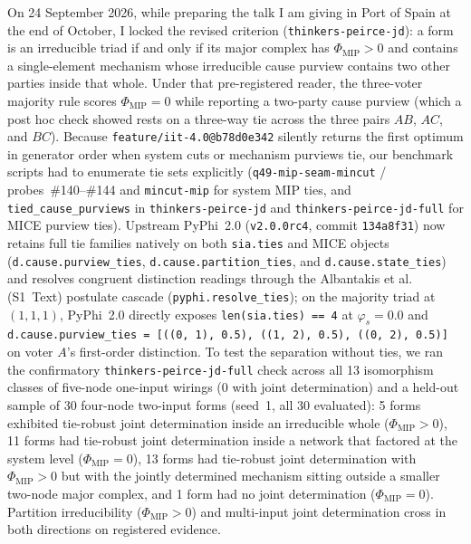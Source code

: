 \documentclass[11pt,a4paper]{article}
\begin{document}
On 24 September 2026, while preparing the talk I am giving in Port of Spain at the end of October, I locked the revised criterion (\texttt{thinkers-peirce-jd}): a form is an irreducible triad if and only if its major complex has $\Phi_{\mathrm{MIP}} > 0$ and contains a single-element mechanism whose irreducible cause purview contains two other parties inside that whole. Under that pre-registered reader, the three-voter majority rule scores $\Phi_{\mathrm{MIP}} = 0$ while reporting a two-party cause purview (which a post hoc check showed rests on a three-way tie across the three pairs $AB$, $AC$, and $BC$). Because \texttt{feature/iit-4.0@b78d0e342} silently returns the first optimum in generator order when system cuts or mechanism purviews tie, our benchmark scripts had to enumerate tie sets explicitly (\texttt{q49-mip-seam-mincut} / probes~\#140--\#144 and \texttt{mincut-mip} for system MIP ties, and \texttt{tied\_cause\_purviews} in \texttt{thinkers-peirce-jd} and \texttt{thinkers-peirce-jd-full} for MICE purview ties). Upstream PyPhi~2.0 (\texttt{v2.0.0rc4}, commit \texttt{134a8f31}) now retains full tie families natively on both \texttt{sia.ties} and MICE objects (\texttt{d.cause.purview\_ties}, \texttt{d.cause.partition\_ties}, and \texttt{d.cause.state\_ties}) and resolves congruent distinction readings through the Albantakis et al.~\cite{albantakis2023iit4} (S1~Text) postulate cascade (\texttt{pyphi.resolve\_ties}); on the majority triad at $(1, 1, 1)$, PyPhi~2.0 directly exposes \texttt{len(sia.ties) == 4} at $\varphi_s = 0.0$ and \texttt{d.cause.purview\_ties = [((0, 1), 0.5), ((1, 2), 0.5), ((0, 2), 0.5)]} on voter $A$'s first-order distinction. To test the separation without ties, we ran the confirmatory \texttt{thinkers-peirce-jd-full} check across all 13 isomorphism classes of five-node one-input wirings (0 with joint determination) and a held-out sample of 30 four-node two-input forms (seed~1, all 30 evaluated): 5 forms exhibited tie-robust joint determination inside an irreducible whole ($\Phi_{\mathrm{MIP}} > 0$), 11 forms had tie-robust joint determination inside a network that factored at the system level ($\Phi_{\mathrm{MIP}} = 0$), 13 forms had tie-robust joint determination with $\Phi_{\mathrm{MIP}} > 0$ but with the jointly determined mechanism sitting outside a smaller two-node major complex, and 1 form had no joint determination ($\Phi_{\mathrm{MIP}} = 0$). Partition irreducibility ($\Phi_{\mathrm{MIP}} > 0$) and multi-input joint determination cross in both directions on registered evidence.
\end{document}
